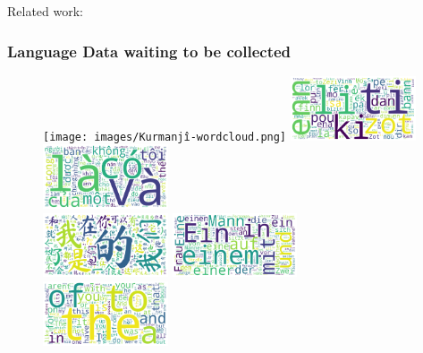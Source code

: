 \documentclass[aspectratio=169]{beamer}
\begin{document}
\begin{frame}[fragile]
    \vspace{0.6cm}
    \begin{minipage}{1.0\textwidth}
    \centering
    \footnotesize
    Related work: \citep{chen2022ApproachingNeuralChinese, lei2021LeveragingZipfsLaw, xie2023CCMBLargescaleChinese, zhang2013ForcedAlignmentApproach, li2024BetterChinesecentricNeural, zhang2024NeuralMachineTranslation, dadparvar2024OrientalWhispersUnveiling}
    \end{minipage}
\end{frame}

\begin{frame}[fragile]
	\frametitle{Language Data waiting to be collected}
    \begin{figure}
	    \centering
	    \texttt{[image: images/Kurmanjî-wordcloud.png]}%
        \includegraphics[width=0.33\textwidth]{images/Morisien-wordcloud.png}%
        \includegraphics[width=0.33\textwidth]{images/Vietnamese-wordcloud.png}
        \\
        \includegraphics[width=0.33\textwidth]{images/Chinese-wordcloud.png}%
        \includegraphics[width=0.33\textwidth]{images/German-wordcloud.png}%
        \includegraphics[width=0.33\textwidth]{images/English-wordcloud.png}
	\end{figure}
\end{frame}
\end{document}
